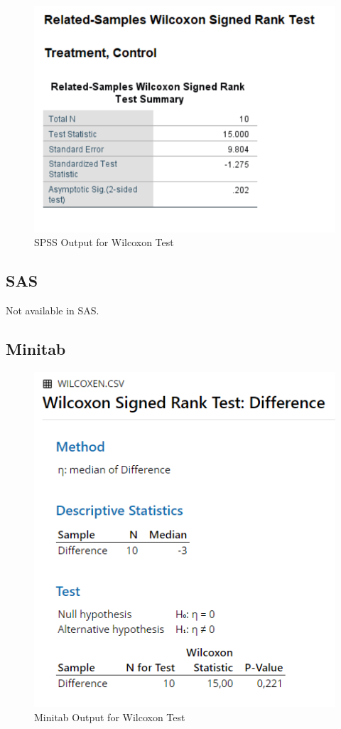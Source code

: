 \documentclass[
]{book}
\begin{document}
\begin{figure}[!h]
\includegraphics{Screenshots/Wilcoxon Test/WilcoxonSPSS} \caption{\label{fig:WilcoxonSPSS}SPSS Output for Wilcoxon Test}\label{fig:WilcoxonSPSS}
\end{figure}

\hypertarget{sas-3}{%
\subsection{SAS}\label{sas-3}}

Not available in SAS.

\hypertarget{minitab-3}{%
\subsection{Minitab}\label{minitab-3}}

\begin{figure}[!h]
\includegraphics{Screenshots/Wilcoxon Test/WilcoxonMinitab} \caption{\label{fig:WilcoxonMinitab}Minitab Output for Wilcoxon Test}\label{fig:WilcoxonMinitab}
\end{figure}
\end{document}

